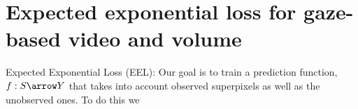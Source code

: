 \chapter{Expected exponential loss for gaze-based video and volume}
\label{eel} %


Expected Exponential Loss (EEL): Our goal is to train a prediction function, $f : S \arrow Y$
that takes into account observed superpixels as well as the unobserved ones. To do this we

